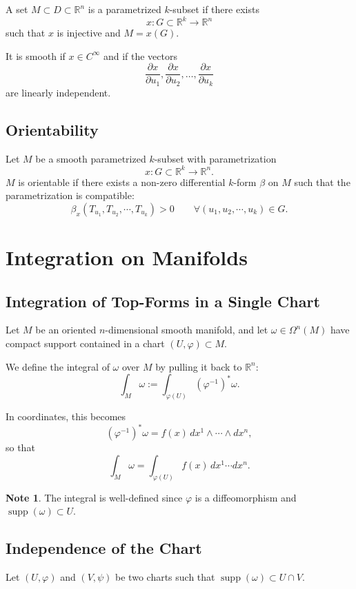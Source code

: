 \documentclass[11pt]{report}
\theoremstyle{definition}
\newtheorem{note}[definition]{Note}
\theoremstyle{plain}
\theoremstyle{remark}
\newcommand{\R}{\mathbb{R}}
\newcommand{\supp}{\operatorname{supp}}
\begin{document}
A set $M\subset D\subset \R^n$ is a parametrized $k$-subset if there exists
\[
x:G\subset \R^k\to \R^n
\]
such that $x$ is injective and $M=x(G)$.

It is smooth if $x\in C^\infty$ and if the vectors
\[
\frac{\partial x}{\partial u_1},\frac{\partial x}{\partial u_2},\dots,\frac{\partial x}{\partial u_k}
\]
are linearly independent.

\subsection{Orientability}

Let $M$ be a smooth parametrized $k$-subset with parametrization
\[
x:G\subset \R^k\to \R^n.
\]
$M$ is orientable if there exists a non-zero differential $k$-form $\beta$ on $M$ such that the parametrization is compatible:
\[
\beta_x(T_{u_1},T_{u_2},\cdots,T_{u_k})>0
\qquad \forall (u_1,u_2,\cdots,u_k)\in G.
\]

\section{Integration on Manifolds}

\subsection{Integration of Top-Forms in a Single Chart}

Let $M$ be an oriented $n$-dimensional smooth manifold, and let $\omega \in \Omega^n(M)$ have compact support contained in a chart $(U,\varphi)\subset M$.

We define the integral of $\omega$ over $M$ by pulling it back to $\R^n$:
\[
\int_M \omega := \int_{\varphi(U)} (\varphi^{-1})^*\omega.
\]

In coordinates, this becomes
\[
(\varphi^{-1})^*\omega = f(x)\,dx^1 \wedge \cdots \wedge dx^n,
\]
so that
\[
\int_M \omega = \int_{\varphi(U)} f(x)\,dx^1 \cdots dx^n.
\]

\begin{note}
The integral is well-defined since $\varphi$ is a diffeomorphism and $\supp(\omega)\subset U$.
\end{note}

\subsection{Independence of the Chart}

Let $(U,\varphi)$ and $(V,\psi)$ be two charts such that $\supp(\omega)\subset U\cap V$.
\end{document}
